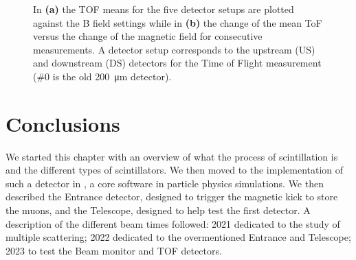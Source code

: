 \begin{refsection}
        \begin{figure}
            \centering
            \hfill
            \caption[muEDM 2023: TOF and magnetic hysteresis]{In \textbf{(a)} the TOF means for the five detector setups are plotted against the B field settings while in \textbf{(b)} the change of the mean ToF versus the change of the magnetic field for consecutive measurements. A detector setup corresponds to the upstream (US) and downstream (DS) detectors for the Time of Flight measurement (\#0 is the old \SI{200}{\micro\meter} detector).}
        \end{figure}

\section{Conclusions}
    We started this chapter with an overview of what the process of scintillation is and the different types of scintillators. We then moved to the implementation of such a detector in \gf, a core software in particle physics simulations.
    We then described the Entrance detector, designed to trigger the magnetic kick to store the muons, and the Telescope, designed to help test the first detector. 
    A description of the different beam times followed: 2021 dedicated to the study of multiple scattering; 2022 dedicated to the overmentioned Entrance and Telescope; 2023 to test the Beam monitor and TOF detectors.


\end{refsection}
